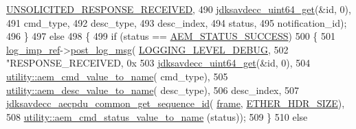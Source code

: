 \begin{DoxyCode}
{{{      \hyperlink{namespaceavdecc__lib_ad2a3e740ca3019cf9fd0f9514afb6419aadf251eb45e15833d30338bfdbc0e243}{UNSOLICITED\_RESPONSE\_RECEIVED},
490                                                         \hyperlink{group__endian_gac8c2b48b7d7db101708e0197e366ac42}{jdksavdecc\_uint64\_get}(&\textcolor{keywordtype}{id}, 0),
491                                                         cmd\_type,
492                                                         desc\_type,
493                                                         desc\_index,
494                                                         status,
495                                                         notification\_id);
496         \}
497         \textcolor{keywordflow}{else}
498         \{
499             \textcolor{keywordflow}{if} (status == \hyperlink{namespaceavdecc__lib_affd436edb2cecd20cfd784a84f852b2bac947077909cb590b84f4b5db413080e0}{AEM\_STATUS\_SUCCESS})
500             \{
501                 \hyperlink{namespaceavdecc__lib_acbe3e2a96ae6524943ca532c87a28529}{log\_imp\_ref}->\hyperlink{classavdecc__lib_1_1log_a68139a6297697e4ccebf36ccfd02e44a}{post\_log\_msg}(
      \hyperlink{namespaceavdecc__lib_a501055c431e6872ef46f252ad13f85cdae3138c2a0a71a6404155ff912e450406}{LOGGING\_LEVEL\_DEBUG},
502                                           \textcolor{stringliteral}{"RESPONSE\_RECEIVED, 0x%
503                                           \hyperlink{group__endian_gac8c2b48b7d7db101708e0197e366ac42}{jdksavdecc\_uint64\_get}(&\textcolor{keywordtype}{id}, 0),
504                                           \hyperlink{namespaceavdecc__lib_1_1utility_a4c304db966bad783728a6a9e0aefed18}{utility::aem\_cmd\_value\_to\_name}(
      cmd\_type),
505                                           \hyperlink{namespaceavdecc__lib_1_1utility_a6bdd02679e5a911a071d4aa03be341f0}{utility::aem\_desc\_value\_to\_name}(
      desc\_type),
506                                           desc\_index,
507                                           
      \hyperlink{group__aecpdu__common_ga4c5015b65543e4753c336d98b63fea28}{jdksavdecc\_aecpdu\_common\_get\_sequence\_id}(
      \hyperlink{gst__avb__playbin_8c_ac8e710e0b5e994c0545d75d69868c6f0}{frame}, \hyperlink{namespaceavdecc__lib_a6c827b1a0d973e18119c5e3da518e65ca9512ad9b34302ba7048d88197e0a2dc0}{ETHER\_HDR\_SIZE}),
508                                           \hyperlink{namespaceavdecc__lib_1_1utility_aca66a547b66fdb27f3221ad0844d60c6}{utility::aem\_cmd\_status\_value\_to\_name}
      (status));
509             \}
510             \textcolor{keywordflow}{else}
}}}}
\end{DoxyCode}
